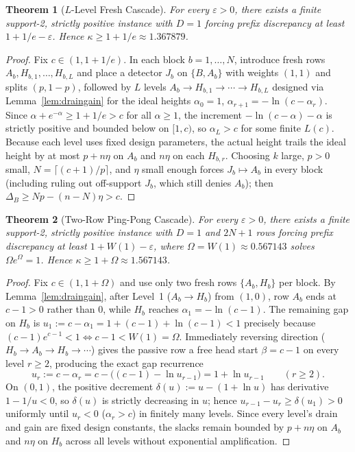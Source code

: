 \documentclass[11pt]{article}
\newtheorem{theorem}{Theorem}
\theoremstyle{definition}
\newcommand{\disc}{\Delta}
\newcommand{\eps}{\varepsilon}
\newcommand{\W}{W}
\begin{document}
\begin{theorem}[$L$-Level Fresh Cascade]\label{thm:cascade}
For every $\eps>0$, there exists a finite support-2, strictly positive instance with $D=1$ forcing prefix discrepancy at least $1+1/e-\eps$. Hence $\kappa\ge 1+1/e\approx 1.367879$.
\end{theorem}
\begin{proof}
Fix $c\in(1,1+1/e)$. In each block $b=1,\dots,N$, introduce fresh rows $A_b,H_{b,1},\dots,H_{b,L}$ and place a detector $J_b$ on $\{B,A_b\}$ with weights $(1,1)$ and splits $(p,1-p)$, followed by $L$ levels $A_b\to H_{b,1}\to\cdots\to H_{b,L}$ designed via Lemma~\ref{lem:draingain} for the ideal heights $\alpha_0=1$, $\alpha_{r+1}=-\ln(c-\alpha_r)$. Since $\alpha+e^{-\alpha}\ge 1+1/e>c$ for all $\alpha\ge 1$, the increment $-\ln(c-\alpha)-\alpha$ is strictly positive and bounded below on $[1,c)$, so $\alpha_L>c$ for some finite $L(c)$. Because each level uses fixed design parameters, the actual height trails the ideal height by at most $p+n\eta$ on $A_b$ and $n\eta$ on each $H_{b,r}$. Choosing $k$ large, $p>0$ small, $N=\lceil (c+1)/p\rceil$, and $\eta$ small enough forces $J_b\mapsto A_b$ in every block (including ruling out off-support $J_b$, which still denies $A_b$); then $\disc_B\ge Np-(n-N)\eta>c$.
\end{proof}

\begin{theorem}[Two-Row Ping-Pong Cascade]\label{thm:pingpong}
For every $\eps>0$, there exists a finite support-2, strictly positive instance with $D=1$ and $2N+1$ rows forcing prefix discrepancy at least $1+\W(1)-\eps$, where $\Omega=\W(1)\approx 0.567143$ solves $\Omega e^\Omega=1$. Hence $\kappa\ge 1+\Omega\approx 1.567143$.
\end{theorem}
\begin{proof}
Fix $c\in(1,1+\Omega)$ and use only two fresh rows $\{A_b,H_b\}$ per block. By Lemma~\ref{lem:draingain}, after Level~1 ($A_b\to H_b$) from $(1,0)$, row $A_b$ ends at $c-1>0$ rather than $0$, while $H_b$ reaches $\alpha_1=-\ln(c-1)$. The remaining gap on $H_b$ is $u_1:=c-\alpha_1=1+(c-1)+\ln(c-1)<1$ precisely because $(c-1)e^{c-1}<1\iff c-1<\W(1)=\Omega$. Immediately reversing direction ($H_b\to A_b\to H_b\to\cdots$) gives the passive row a free head start $\beta=c-1$ on every level $r\ge 2$, producing the exact gap recurrence
\[
 u_r := c-\alpha_r = c - \bigl((c-1)-\ln u_{r-1}\bigr) = 1+\ln u_{r-1}\qquad (r\ge 2).
\]
On $(0,1)$, the positive decrement $\delta(u):=u-(1+\ln u)$ has derivative $1-1/u<0$, so $\delta(u)$ is strictly decreasing in $u$; hence $u_{r-1}-u_r\ge \delta(u_1)>0$ uniformly until $u_r<0$ ($\alpha_r>c$) in finitely many levels. Since every level's drain and gain are fixed design constants, the slacks remain bounded by $p+n\eta$ on $A_b$ and $n\eta$ on $H_b$ across all levels without exponential amplification.
\end{proof}
\end{document}
